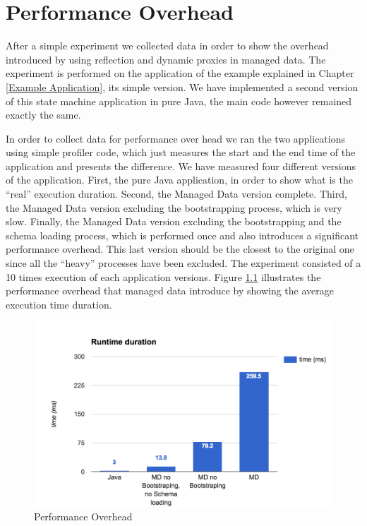 

\chapter{Performance Overhead}\label{appdx:PerformanceOverhead}

After a simple experiment we collected data in order to show the overhead introduced by using reflection and dynamic proxies in managed data.
The experiment is performed on the application of the example explained in Chapter \ref{Example Application}, its simple version.
We have implemented a second version of this state machine application in pure Java, the main code however remained exactly the same.

In order to collect data for performance over head we ran the two applications using simple profiler code, which just measures the start and the end time of the application and presents the difference.
We have measured four different versions of the application.
First, the pure Java application, in order to show what is the ``real'' execution duration.
Second, the Managed Data version complete.
Third, the Managed Data version excluding the bootstrapping process, which is very slow.
Finally, the Managed Data version excluding the bootstrapping and the schema loading process, which is performed once and also introduces a significant performance overhead.
This last version should be the closest to the original one since all the ``heavy'' processes have been excluded.
The experiment consisted of a 10 times execution of each application versions.
Figure \ref{fig:Performance Overhead} illustrates the performance overhead that managed data introduce by showing the average execution time duration.

\begin{figure}[H]
	\centering
	\includegraphics[scale=0.5]{figures/PerformanceOverhead.png}
	\caption{Performance Overhead}
  	\label{fig:Performance Overhead}
\end{figure}

